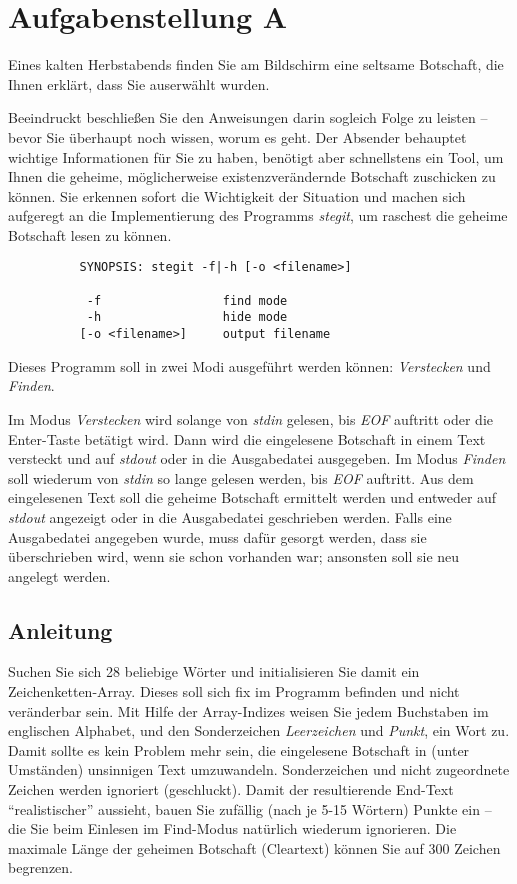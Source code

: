 




\section*{Aufgabenstellung A}

Eines kalten Herbstabends finden Sie am Bildschirm eine seltsame Botschaft, die
Ihnen erklärt, dass Sie auserwählt wurden.

Beeindruckt beschließen Sie den Anweisungen darin sogleich Folge zu leisten --
bevor Sie überhaupt noch wissen, worum es geht. Der Absender behauptet wichtige
Informationen für Sie zu haben, benötigt aber schnellstens ein Tool, um Ihnen
die geheime, möglicherweise existenzverändernde Botschaft zuschicken zu können.
Sie erkennen sofort die Wichtigkeit der Situation und machen sich aufgeregt an
die Implementierung des Programms \emph{stegit}, um raschest die geheime
Botschaft lesen zu können.

\begin{verbatim}
          SYNOPSIS: stegit -f|-h [-o <filename>]

           -f                 find mode
           -h                 hide mode
          [-o <filename>]     output filename
\end{verbatim}

Dieses Programm soll in zwei Modi ausgeführt werden können: \emph{Verstecken}
und \emph{Finden}.

Im Modus \emph{Verstecken} wird solange von \emph{stdin} gelesen, bis \emph{EOF}
auftritt oder die Enter-Taste betätigt wird. Dann wird die eingelesene Botschaft
in einem Text versteckt und auf \emph{stdout} oder in die Ausgabedatei
ausgegeben. Im Modus \emph{Finden} soll wiederum von \emph{stdin} so lange
gelesen werden, bis \emph{EOF} auftritt. Aus dem eingelesenen Text soll die
geheime Botschaft ermittelt werden und entweder auf \emph{stdout} angezeigt oder
in die Ausgabedatei geschrieben werden. Falls eine Ausgabedatei angegeben wurde,
muss dafür gesorgt werden, dass sie überschrieben wird, wenn sie schon vorhanden
war; ansonsten soll sie neu angelegt werden.

\subsection*{Anleitung}
Suchen Sie sich 28 beliebige Wörter und initialisieren Sie damit ein
Zeichenketten-Array. Dieses soll sich fix im Programm befinden und nicht
veränderbar sein. Mit Hilfe der Array-Indizes weisen Sie jedem Buchstaben im
englischen Alphabet, und den Sonderzeichen \emph{Leerzeichen} und \emph{Punkt},
ein Wort zu. Damit sollte es kein Problem mehr sein, die eingelesene Botschaft
in (unter Umständen) unsinnigen Text umzuwandeln. Sonderzeichen und nicht
zugeordnete Zeichen werden ignoriert (geschluckt). Damit der resultierende
End-Text "`realistischer"' aussieht, bauen Sie zufällig (nach je 5-15 Wörtern)
Punkte ein -- die Sie beim Einlesen im Find-Modus natürlich wiederum ignorieren.
Die maximale Länge der geheimen Botschaft (Cleartext) können Sie auf 300 Zeichen
begrenzen.

